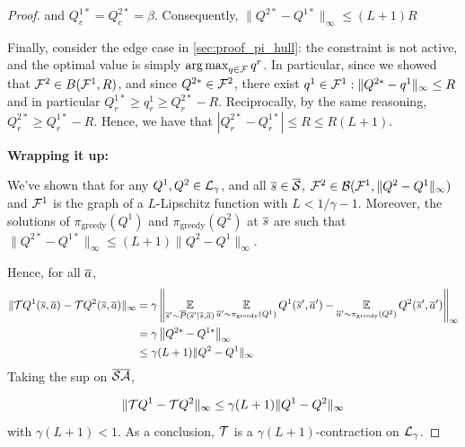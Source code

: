 \begin{subappendices}
\begin{proof}
	and $Q_c^{1*} = Q_c^{2*} = \beta$.
	Consequently, $ \|Q^{2*} - Q^{1*}\|_\infty \leq (L+1)R$
	
	Finally, consider the edge case in \autoref{sec:proof_pi_hull}: the constraint is not active, and the optimal value is simply $\operatorname*{arg\,max}_{q\in\mathcal{F}} q^r$. In particular, since we showed that $\mathcal{F}^2\in B(\mathcal{F}^1, R)$, and since $Q^{2*}\in \mathcal{F}^2$, there exist $q^1\in \mathcal{F}^1: \|Q^{2*}-q^1\|_\infty\leq R$ and in particular $Q^{1*}_r \geq q^1_r \geq Q^{2*}_r - R$. Reciprocally, by the same reasoning, $Q^{2*}_r \geq Q^{1*}_r - R$. Hence, we have that $| Q_r^{2*} - Q_r^{1*}| \leq R \leq R(L+1).$
	
	\textbf{Wrapping it up:}
	
	We've shown that for any $Q^1,Q^2\in\mathcal{L}_\gamma$, and all $\overline{s}\in\overline{\mathcal{S}}$, $\mathcal{F}^2\in\mathcal{B}(\mathcal{F}^1,\|Q^2-Q^1\|_\infty)$ and $\mathcal{F}^1$ is the graph of a $L$-Lipschitz function with $L<1/\gamma - 1$. Moreover, the solutions of $\pi_\text{greedy}(Q^1)$ and $\pi_\text{greedy}(Q^2)$ at $\overline{s}$ are such that $ \|Q^{2*} - Q^{1*}\|_\infty \leq (L+1)\|Q^2-Q^1\|_\infty$.
	
	Hence, for all $\overline{a}$,
	\begin{align*}
	\|\mathcal{T} Q^1(\overline{s}, \overline{a}) - \mathcal{T} Q^2(\overline{s}, \overline{a})\|_\infty &= \gamma\left\|\operatorname*{\mathbb{E}}\limits_{\overline{s}'\sim\overline{P}(\overline{s}'|\overline{s},\overline{a})} \operatorname*{\mathbb{E}}\limits_{\overline{a}'\sim\pi_\text{greedy}(Q^1)}Q^1(\overline{s}',\overline{a}') - \operatorname*{\mathbb{E}}\limits_{\overline{a}'\sim\pi_\text{greedy}(Q^2)}Q^2(\overline{s}',\overline{a}')\right\|_\infty \\
	&= \gamma\left\|Q^{2*} - Q^{1*}\right\|_\infty \\
	&\leq \gamma(L+1)\|Q^2-Q^1\|_\infty
	\end{align*}
	Taking the sup on $\overline{\mathcal{S}}\overline{\mathcal{A}}$,
	
	\begin{equation*}
	\|\mathcal{T} Q^1 - \mathcal{T} Q^2\|_\infty \leq \gamma(L+1)\|Q^1-Q^2\|_\infty
	\end{equation*}
	with $\gamma(L+1) < 1$.
	As a conclusion, $\mathcal{T}$ is a $\gamma(L+1)$-contraction on $\mathcal{L}_\gamma$.
\end{proof}





\end{subappendices}
